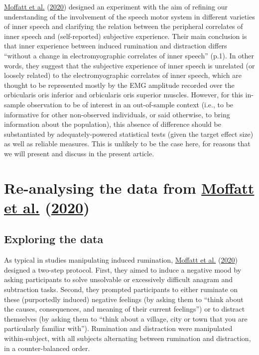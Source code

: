 \documentclass[
  english,
  man, donotrepeattitle,mask,floatsintext]{apa6}
\begin{document}
\protect\hyperlink{ref-moffatt_inner_2020}{Moffatt et al.} (\protect\hyperlink{ref-moffatt_inner_2020}{2020}) designed an experiment with the aim of refining our understanding of the involvement of the speech motor system in different varieties of inner speech and clarifying the relation between the peripheral correlates of inner speech and (self-reported) subjective experience. Their main conclusion is that inner experience between induced rumination and distraction differs ``without a change in electromyographic correlates of inner speech'' (p.1). In other words, they suggest that the subjective experience of inner speech is unrelated (or loosely related) to the electromyographic correlates of inner speech, which are thought to be represented mostly by the EMG amplitude recorded over the orbicularis oris inferior and orbicularis oris superior muscles. However, for this in-sample observation to be of interest in an out-of-sample context (i.e., to be informative for other non-observed individuals, or said otherwise, to bring information about the population), this absence of difference should be substantiated by adequately-powered statistical tests (given the target effect size) as well as reliable measures. This is unlikely to be the case here, for reasons that we will present and discuss in the present article.

\hypertarget{re-analysing-the-data-from-moffatt_inner_2020}{%
\section{\texorpdfstring{Re-analysing the data from \protect\hyperlink{ref-moffatt_inner_2020}{Moffatt et al.} (\protect\hyperlink{ref-moffatt_inner_2020}{2020})}{Re-analysing the data from Moffatt et al. (2020)}}\label{re-analysing-the-data-from-moffatt_inner_2020}}

\hypertarget{exploring-the-data}{%
\subsection{Exploring the data}\label{exploring-the-data}}

As typical in studies manipulating induced rumination, \protect\hyperlink{ref-moffatt_inner_2020}{Moffatt et al.} (\protect\hyperlink{ref-moffatt_inner_2020}{2020}) designed a two-step protocol. First, they aimed to induce a negative mood by asking participants to solve unsolvable or excessively difficult anagram and subtraction tasks. Second, they prompted participants to either ruminate on these (purportedly induced) negative feelings (by asking them to ``think about the causes, consequences, and meaning of their current feelings'') or to distract themselves (by asking them to ``think about a village, city or town that you are particularly familiar with''). Rumination and distraction were manipulated within-subject, with all subjects alternating between rumination and distraction, in a counter-balanced order.
\end{document}
